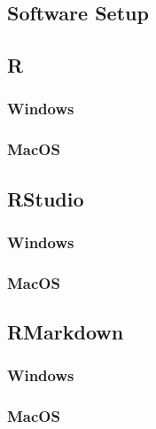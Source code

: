 \documentclass[]{article}
\begin{document}
\hypertarget{software-setup}{%
\subsection{Software Setup}\label{software-setup}}

\hypertarget{r}{%
\subsection{R}\label{r}}

\hypertarget{windows}{%
\subsubsection{Windows}\label{windows}}

\hypertarget{macos}{%
\subsubsection{MacOS}\label{macos}}

\hypertarget{rstudio}{%
\subsection{RStudio}\label{rstudio}}

\hypertarget{windows-1}{%
\subsubsection{Windows}\label{windows-1}}

\hypertarget{macos-1}{%
\subsubsection{MacOS}\label{macos-1}}

\hypertarget{rmarkdown}{%
\subsection{RMarkdown}\label{rmarkdown}}

\hypertarget{windows-2}{%
\subsubsection{Windows}\label{windows-2}}

\hypertarget{macos-2}{%
\subsubsection{MacOS}\label{macos-2}}
\end{document}
